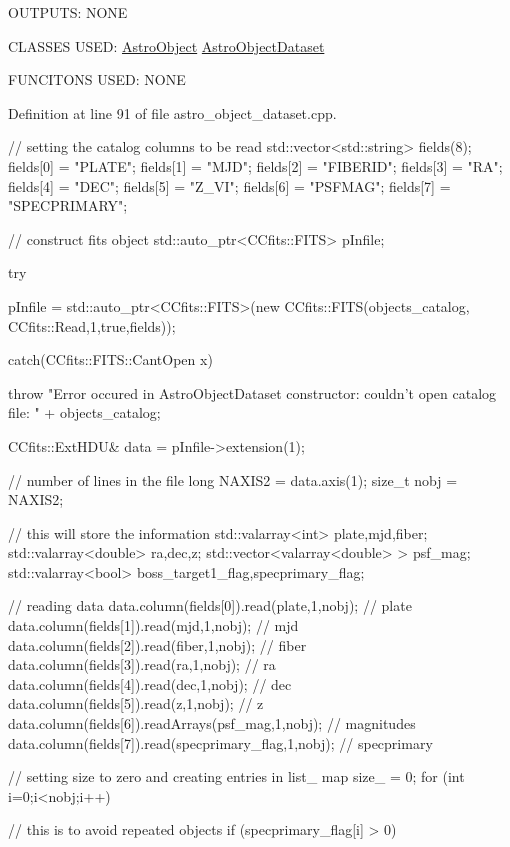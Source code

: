 O\-U\-T\-P\-U\-T\-S\-: N\-O\-N\-E

C\-L\-A\-S\-S\-E\-S U\-S\-E\-D\-: \hyperlink{class_astro_object}{Astro\-Object} \hyperlink{class_astro_object_dataset}{Astro\-Object\-Dataset}

F\-U\-N\-C\-I\-T\-O\-N\-S U\-S\-E\-D\-: N\-O\-N\-E

Definition at line 91 of file astro\-\_\-object\-\_\-dataset.\-cpp.


\begin{DoxyCode}
                                                                               
                              {
    // setting the catalog columns to be read
    std::vector<std::string> fields(8);
    fields[0] = "PLATE";
    fields[1] = "MJD";
    fields[2] = "FIBERID";
    fields[3] = "RA";
    fields[4] = "DEC";
    fields[5] = "Z_VI";
    fields[6] = "PSFMAG";
    fields[7] = "SPECPRIMARY";
    
    // construct fits object
    std::auto_ptr<CCfits::FITS> pInfile; 
    
    try{
        
        pInfile = std::auto_ptr<CCfits::FITS>(new CCfits::FITS(objects_catalog,
      CCfits::Read,1,true,fields));
        
    } catch(CCfits::FITS::CantOpen x) {
        
        throw "Error occured in AstroObjectDataset constructor: couldn't open
       catalog file: " + objects_catalog;
    }
    CCfits::ExtHDU& data = pInfile->extension(1);
    
    // number of lines in the file
    long NAXIS2 = data.axis(1);
    size_t nobj = NAXIS2;
    
    // this will store the information
    std::valarray<int> plate,mjd,fiber;
    std::valarray<double> ra,dec,z;
    std::vector<valarray<double> > psf_mag;
    std::valarray<bool> boss_target1_flag,specprimary_flag;
    
    // reading data
    data.column(fields[0]).read(plate,1,nobj); // plate
    data.column(fields[1]).read(mjd,1,nobj); // mjd
    data.column(fields[2]).read(fiber,1,nobj); // fiber
    data.column(fields[3]).read(ra,1,nobj); // ra
    data.column(fields[4]).read(dec,1,nobj); // dec
    data.column(fields[5]).read(z,1,nobj); // z
    data.column(fields[6]).readArrays(psf_mag,1,nobj); // magnitudes
    data.column(fields[7]).read(specprimary_flag,1,nobj); // specprimary
    
    // setting size to zero and creating entries in list_ map
    size_ = 0;
    for (int i=0;i<nobj;i++){
        // this is to avoid repeated objects
        if (specprimary_flag[i] > 0){            
            
}}}
\end{DoxyCode}
